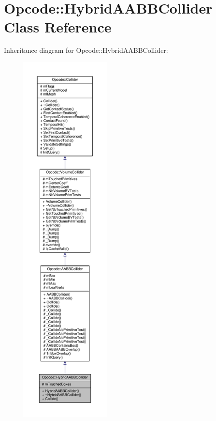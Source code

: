 \hypertarget{classOpcode_1_1HybridAABBCollider}{}\section{Opcode\+:\+:Hybrid\+A\+A\+B\+B\+Collider Class Reference}
\label{classOpcode_1_1HybridAABBCollider}


Inheritance diagram for Opcode\+:\+:Hybrid\+A\+A\+B\+B\+Collider\+:
\nopagebreak
\begin{figure}[H]
\begin{center}
\leavevmode
\includegraphics[height=550pt]{d6/d49/classOpcode_1_1HybridAABBCollider__inherit__graph}
\end{center}
\end{figure}


